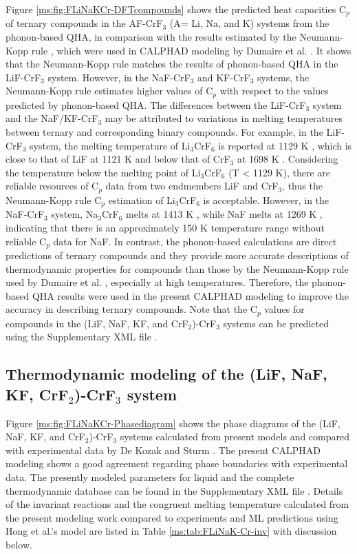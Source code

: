 Figure \ref{ms:fig:FLiNaKCr-DFTcompounds} shows the predicted heat capacities C$_p$ of ternary compounds in the AF-CrF$_3$ (A= Li, Na, and K) systems from the phonon-based QHA, in comparison with the results estimated by the Neumann-Kopp rule \cite{leitner2010application}, which were used in CALPHAD modeling by Dumaire et al. \cite{dumaire2021thermodynamic}. It shows that the Neumann-Kopp rule matches the results of phonon-based QHA in the LiF-CrF$_3$ system. However, in the NaF-CrF$_3$ and KF-CrF$_3$ systems, the Neumann-Kopp rule estimates higher values of C$_p$ with respect to the values predicted by phonon-based QHA. The differences between the LiF-CrF$_3$ system and the NaF/KF-CrF$_3$ may be attributed to variations in melting temperatures between ternary and corresponding binary compounds. For example, in the LiF-CrF$_3$ system, the melting temperature of Li$_3$CrF$_6$ is reported at 1129 K \cite{DeKozak1969}, which is close to that of LiF at 1121 K and below that of CrF$_3$ at 1698 K \cite{sgteurl}. Considering the temperature below the melting point of Li$_3$CrF$_6$ (T < 1129 K), there are reliable resources of C$_p$ data from two endmembers LiF and CrF$_3$, thus the Neumann-Kopp rule C$_p$ estimation of Li$_3$CrF$_6$ is acceptable. However, in the NaF-CrF$_3$ system, Na$_3$CrF$_6$ melts at 1413 K \cite{DeKozak1969}, while NaF melts at 1269 K \cite{sgteurl}, indicating that there is an approximately 150 K temperature range without reliable C$_p$ data for NaF. In contrast, the phonon-based calculations are direct predictions of ternary compounds and they provide more accurate descriptions of thermodynamic properties for compounds than those by the Neumann-Kopp rule used by Dumaire et al. \cite{dumaire2021thermodynamic}, especially at high temperatures. Therefore, the phonon-based QHA results were used in the present CALPHAD modeling to improve the accuracy in describing ternary compounds. Note that the C$_p$ values for compounds in the (LiF, NaF, KF, and CrF$_2$)-CrF$_3$ systems can be predicted using the Supplementary XML file \cite{gong2024revisiting}.

\subsection{Thermodynamic modeling of the (LiF, NaF, KF, CrF$_2$)-CrF$_3$ system} \label{moltensalts:ssec:FLiNaKCrmodeling}

Figure \ref{ms:fig:FLiNaKCr-Phasediagram} shows the phase diagrams of the (LiF, NaF, KF, and CrF$_2$)-CrF$_3$ systems calculated from present models and compared with experimental data by De Kozak \cite{de1975systeme, DeKozak1969} and Sturm \cite{sturm1962phase}. The present CALPHAD modeling shows a good agreement regarding phase boundaries with experimental data. The presently modeled parameters for liquid and the complete thermodynamic database can be found in the Supplementary XML file \cite{gong2024revisiting}. Details of the invariant reactions and the congruent melting temperature calculated from the present modeling work compared to experiments \cite{de1975systeme, DeKozak1969, sturm1962phase} and ML predictions using Hong et al.’s model \cite{hong2022melting} are listed in Table \ref{ms:tab:FLiNaK-Cr-inv} with discussion below. 

